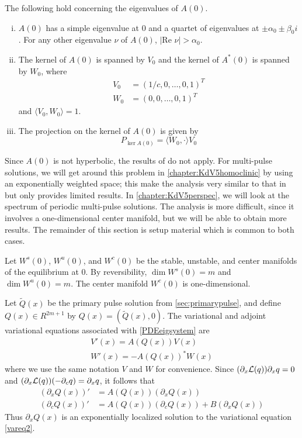 \documentclass[thesis.tex]{subfiles}
\begin{document}
\begin{lemma}\label{eigA0lemma}
The following hold concerning the eigenvalues of $A(0)$.
\begin{enumerate}[(i)]
\item $A(0)$ has a simple eigenvalue at 0 and a quartet of eigenvalues at $\pm \alpha_0 \pm \beta_0 i$. For any other eigenvalue $\nu$ of $A(0)$, $|\text{Re }\nu| > \alpha_0$.
\item The kernel of $A(0)$ is spanned by $V_0$ and the kernel of $A^*(0)$ is spanned by $W_0$, where
\begin{align}
V_0 &= (1/c, 0, \dots, 0, 1)^T \label{V0} \\
W_0 &= (0, 0, \dots, 0, 1)^T \label{W0}
\end{align}
and $\langle V_0, W_0 \rangle = 1$.
\item The projection on the kernel of $A(0)$ is given by
\begin{equation}\label{projkernelA0}
P_{\ker A(0)} = \langle W_0, \cdot \rangle V_0
\end{equation}
\end{enumerate} 
\end{lemma}

\noi Since $A(0)$ is not hyperbolic, the results of \cite{Sandstede1998} do not apply. For multi-pulse solutions, we will get around this problem in \cref{chapter:KdV5homoclinic} by using an exponentially weighted space; this make the analysis very similar to that in \cite{Sandstede1998} but only provides limited results. In \cref{chapter:KdV5perspec}, we will look at the spectrum of periodic multi-pulse solutions. The analysis is more difficult, since it involves a one-dimensional center manifold, but we will be able to obtain more results. The remainder of this section is setup material which is common to both cases.

Let $W^s(0)$, $W^u(0)$, and $W^c(0)$ be the stable, unstable, and center manifolds of the equilibrium at 0. By reversibility, $\dim W^s(0) = m$ and $\dim W^u(0) = m$. The center manifold $W^c(0)$ is one-dimensional.

Let $\tilde{Q}(x)$ be the primary pulse solution from \cref{sec:primarypulse}, and define $Q(x) \in R^{2m+1}$ by $Q(x) = (\tilde{Q}(x), 0)$. The variational and adjoint variational equations associated with \cref{PDEeigsystem} are
\begin{align}
V'(x) = A(Q(x)) V(x) \label{vareq2} \\
W'(x) = -A(Q(x))^* W(x) \label{adjvareq2}
\end{align}
where we use the same notation $V$ and $W$ for convenience. Since $(\partial_x \mathcal{L}(q))\partial_x q = 0$ and $(\partial_x \mathcal{L}(q))(-\partial_c q) = \partial_x q$, it follows that 
\begin{align}
(\partial_x Q(x))' &= A(Q(x))(\partial_x Q(x)) \label{Qprimevarsol} \\
(\partial_c Q(x))' &= A(Q(x))(\partial_c Q(x)) + B(\partial_x Q(x))\label{Qcvarsol}
\end{align}
Thus $\partial_x Q(x)$ is an exponentially localized solution to the variational equation \eqref{vareq2}.
\end{document}
